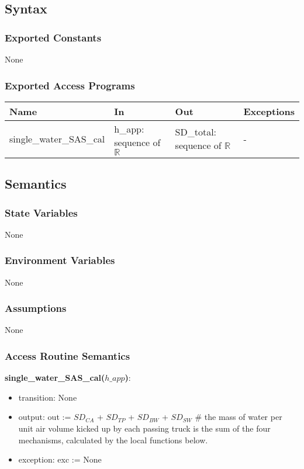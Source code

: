 \documentclass[12pt, titlepage]{article}
\begin{document}
\subsection{Syntax}

\subsubsection{Exported Constants}
None
\subsubsection{Exported Access Programs}

\begin{center}
\begin{tabular}{p{4cm} p{4.5cm} p{4.5cm} p{2cm}}
\hline
\textbf{Name} & \textbf{In} & \textbf{Out} & \textbf{Exceptions} \\
\hline

single\_water\_SAS\_cal & h\_app: sequence of $\mathbb{R}$ & SD\_total: sequence of $\mathbb{R}$ & - \\
\hline
\end{tabular}
\end{center}

\subsection{Semantics}

\subsubsection{State Variables}
None
\subsubsection{Environment Variables}
None
\subsubsection{Assumptions}
None
\subsubsection{Access Routine Semantics}

\noindent \textbf{single\_water\_SAS\_cal($h\_app$)}:
\begin{itemize}
\item transition: None
\item output: out := $\mathit{SD_{CA}}$ + $\mathit{SD_{TP}}$ + $\mathit{SD_{BW}}$ + $\mathit{SD_{SW}}$ \# the mass of water per unit air volume kicked up by each passing truck is the sum of the four mechanisms, calculated by the local functions below.
\item exception: exc := None
\end{itemize}
\end{document}
